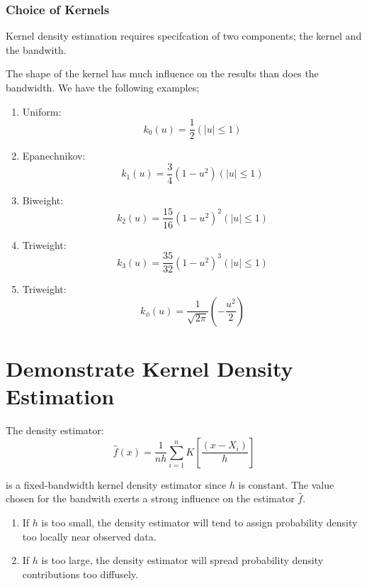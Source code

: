 \documentclass[twoside]{article}
\theoremstyle{definition}
\theoremstyle{definition}
\begin{document}
\subsubsection{Choice of Kernels}

Kernel density estimation requires specifcation of two components; the kernel and the bandwith. 

The shape of the kernel has much influence on the results than does the bandwidth. We have the following examples;

\begin{enumerate}
\item Uniform:
\begin{equation}
k_0(u) = \frac{1}{2}(|u| \leq 1)
\end{equation}
\item Epanechnikov:
\begin{equation}
k_1(u) = \frac{3}{4}(1-u^2)(|u| \leq 1)
\end{equation}
\item Biweight:
\begin{equation}
k_2(u) = \frac{15}{16}(1-u^2)^2(|u| \leq 1)
\end{equation}
\item Triweight:
\begin{equation}
k_3(u) = \frac{35}{32}(1-u^2)^3(|u| \leq 1)
\end{equation}
\item Triweight:
\begin{equation}
k_\phi(u) = \frac{1}{\sqrt{2\pi}}\left( -\frac{u^2}{2}\right)
\end{equation}
\end{enumerate}

\section{Demonstrate Kernel Density Estimation}

The density estimator:
 \begin{equation}
 \hat{f}(x) =  \frac{1}{nh}\sum^n_{i=1}K \left[\frac{(x-X_i)}{h}\right]
  \end{equation}
  
  is a fixed-bandwidth kernel density estimator since $h$ is constant. The value chosen for the bandwith exerts a strong influence on the estimator $\hat{f}$. 
  \begin{enumerate}
  \item If $h$ is too small, the density estimator will tend to assign probability density too locally near observed data. 
  \item If $h$ is too large, the density estimator will spread probability density contributions too diffusely. 
  \end{enumerate}
  
\end{document}
